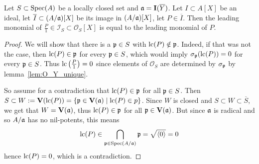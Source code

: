 \begin{lemma}\label{lem:embed_preserves_LM}
  Let $S \subset \operatorname{Spec}(A)$ be a locally closed set and $\mathfrak{a} = \operatorname{\mathbf I}(\overline Y)$. Let $I \subset A[X]$ be an ideal, let $\overline I \subset (A/\mathfrak{a})[X]$ be its image in $(A/\mathfrak{a})[X]$, let $P \in \overline I$. Then the leading monomial of $\frac P 1 \in \mathcal I_{S} \subset \mathcal O_{S}[X]$ is equal to the leading monomial of $P$.
\end{lemma}
\begin{proof}
  We will show that there is a $\mathfrak p \in S$ with $\operatorname{lc}(P) \notin \mathfrak p$. Indeed, if that was not the case, then $\operatorname{lc}(P) \in \mathfrak p$ for every $\mathfrak p \in S$, which would imply $\sigma_{\mathfrak p}(\operatorname{lc}(P)) = 0$ for every $\mathfrak p \in S$. Thus $\operatorname{lc}\left(\frac P 1\right) = 0$ since elements of $\mathcal O_{S}$ are determined by $\sigma_{\mathfrak p}$ by lemma~\ref{lem:O_Y_unique}.

  So assume for a contradiction that $\operatorname{lc}(P) \in \mathfrak p$ for all $\mathfrak p \in S$. Then $S \subset W := \operatorname{\mathbf V}(\operatorname{lc}(P)) = \{\mathfrak p \in \operatorname{\mathbf V}(\mathfrak{a}) \mid \operatorname{lc}(P) \in p\}$. Since $W$ is closed and $S \subset W \subset \overline S$, we get that $W = \operatorname{\mathbf V}(\mathfrak{a})$, thus $\operatorname{lc}(P) \in \mathfrak p $ for all $\mathfrak p \in \operatorname{\mathbf V}(\mathfrak{a})$. But since $\mathfrak{a}$ is radical and so $A/\mathfrak{a}$ has no nil-potents, this means
  \[\operatorname{lc}(P) \in \bigcap_{\mathfrak p \in \operatorname{Spec}(A/\mathfrak{a})} \mathfrak p = \sqrt{\langle 0 \rangle} = 0\]
  hence $\operatorname{lc}(P) = 0$, which is a contradiction.
\end{proof}



